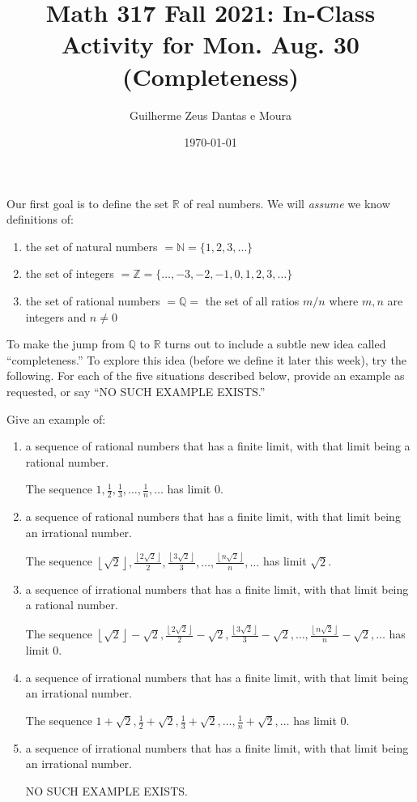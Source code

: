 \documentclass[11pt]{amsart}
\title{Math 317 Fall 2021: In-Class Activity for Mon. Aug. 30 (Completeness)}
\author{Guilherme Zeus Dantas e Moura}
\date{\today}
\newcommand{\floor}[1]{\left\lfloor #1 \right\rfloor}
\begin{document}
\maketitle

Our first goal is to define the set \(\mathbb{R}\) of real numbers. We will \emph{assume} we know definitions of:
\begin{enumerate}[label = \textbullet, left = 0pt]
	\item the set of natural numbers \( = \mathbb{N} = \{1, 2, 3, \dots\}\)
	\item the set of integers \( = \mathbb{Z} = \{\dots, -3, -2, -1, 0, 1, 2, 3, \dots\}\)
	\item the set of rational numbers \( = \mathbb{Q} = \) the set of all ratios \(m/n\) where \(m, n\) are integers and \(n \neq 0\)
\end{enumerate}

To make the jump from \(\mathbb{Q}\) to \(\mathbb{R}\) turns out to include a subtle new idea called ``completeness.'' To explore this idea (before we define it later this week), try the following. For each of the five situations described below, provide an example as requested, or say ``NO SUCH EXAMPLE EXISTS.''

Give an example of:
\begin{enumerate}[label = (\arabic*), left = 0pt]
	\item a sequence of rational numbers that has a finite limit, with that limit being a rational number.

		The sequence 
		\( 1, \frac{1}{2}, \frac{1}{3}, \dots, \frac{1}{n}, \dots \)
		has limit \(0\).

	\item a sequence of rational numbers that has a finite limit, with that limit being an irrational number.
		
		The sequence 
		\(  \floor{\sqrt{2}}, \frac{\floor{2\sqrt{2}}}{2}, \frac{\floor{3\sqrt{2}}}{3}, \dots, \frac{\floor{n\sqrt{2}}}{n}, \dots \) 
		has limit \(\sqrt{2}\).

	\item a sequence of irrational numbers that has a finite limit, with that limit being a rational number.
		
		The sequence 
		\(  \floor{\sqrt{2}} - \sqrt{2}, \frac{\floor{2\sqrt{2}}}{2} - \sqrt{2}, \frac{\floor{3\sqrt{2}}}{3} - \sqrt{2}, \dots, \frac{\floor{n\sqrt{2}}}{n} - \sqrt{2}, \dots \) 
		has limit \(0\).
		
	\item a sequence of irrational numbers that has a finite limit, with that limit being an irrational number.

		The sequence 
		\( 1 + \sqrt{2}, \frac{1}{2} + \sqrt{2}, \frac{1}{3} + \sqrt{2}, \dots, \frac{1}{n} + \sqrt{2}, \dots \)
		has limit \(0\).

	\item a sequence of irrational numbers that has a finite limit, with that limit being an irrational number.

		NO SUCH EXAMPLE EXISTS.

\end{enumerate}
\end{document}
